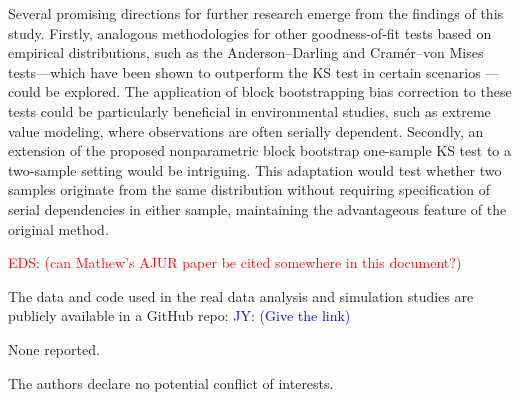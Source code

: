 \documentclass[APA,Times1COL]{WileyNJDv5} %
\newcommand{\jy}[1]{\textcolor{blue}{JY: (#1)}}
\newcommand{\eds}[1]{\textcolor{red}{EDS: (#1)}}
\begin{document}
Several promising directions for further research emerge from the findings of
this study. Firstly, analogous methodologies for other goodness-of-fit tests
based on empirical distributions, such as the Anderson--Darling and Cramér--von
Mises tests---which have been shown to outperform the KS test in certain scenarios
\citep{stephens2017tests}---could be explored. The application of block
bootstrapping bias correction to these tests could be particularly beneficial in
environmental studies, such as extreme value modeling, where observations are
often serially dependent. Secondly, an extension of the proposed nonparametric
block bootstrap one-sample KS test to a two-sample setting would be
intriguing. This adaptation would test whether two samples originate from the
same distribution without requiring specification of serial dependencies in
either sample, maintaining the advantageous feature of the original method.

\eds{can Mathew's AJUR paper be cited somewhere in this document?}


The data and code used in the real data analysis and simulation
studies are publicly available in a GitHub repo:
\jy{Give the link}


None reported.


The authors declare no potential conflict of interests.








\end{document}
